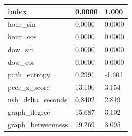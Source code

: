\begin{tabular}{lll}
\toprule
index & 0.0000 & 1.000 \\
\midrule
hour\_sin & 0.0000 & 0.0000 \\
hour\_cos & 0.0000 & 0.0000 \\
dow\_sin & 0.0000 & 0.0000 \\
dow\_cos & 0.0000 & 0.0000 \\
path\_entropy & 0.2991 & -1.601 \\
peer\_z\_score & 13.100 & 3.154 \\
usb\_delta\_seconds & 0.8402 & 2.819 \\
graph\_degree & 15.687 & 3.102 \\
graph\_betweenness & 19.269 & 3.095 \\
\bottomrule
\end{tabular}
